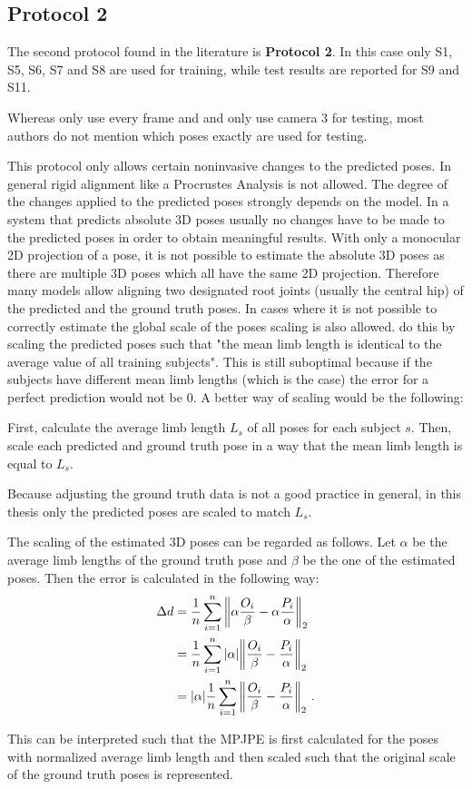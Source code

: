 \subsection{Protocol 2}\label{sec:protocol2}

The second protocol found in the literature is \textbf{Protocol 2}.
In this case only S1, S5, S6, S7 and S8 are used for training, while test results are reported for S9 and S11.

Whereas \citet{sun17} only use every  frame and \citet{moreno-noguer16} and \citet{bogo16} only use camera 3 for testing, most authors do not mention which poses exactly are used for testing.

This protocol only allows certain noninvasive changes to the predicted poses.
In general rigid alignment like a Procrustes Analysis is not allowed.
The degree of the changes applied to the predicted poses strongly depends on the model.
In a system that predicts absolute 3D poses usually no changes have to be made to the predicted poses in order to obtain meaningful results.
With only a monocular 2D projection of a pose, it is not possible to estimate the absolute 3D poses as there are multiple 3D poses which all have the same 2D projection.
Therefore many models \cite{martinez17, zhou18, zhou16, tekin16, pavlakos17} allow aligning two designated root joints (usually the central hip) of the predicted and the ground truth poses.
In cases where it is not possible to correctly estimate the global scale of the poses scaling is also allowed.
\citet{zhou18} do this by scaling the predicted poses such that "the mean limb length is identical to the average value of all training subjects".
This is still suboptimal because if the subjects have different mean limb lengths (which is the case) the error for a perfect prediction would not be 0.
A better way of scaling would be the following:

First, calculate the average limb length $L_s$ of all poses for each subject $s$.
Then, scale each predicted and ground truth pose in a way that the mean limb length is equal to $L_s$.

Because adjusting the ground truth data is not a good practice in general, in this thesis only the predicted poses are scaled to match $L_s$.

The scaling of the estimated 3D poses can be regarded as follows. Let $\alpha$ be the average limb lengths of the ground truth pose and $\beta$ be the one of the estimated poses.
Then the error is calculated in the following way:
\begin{align}
	\Delta d &= \frac{1}{n} \sum_{i = 1}^{n}  \norm{\alpha \frac{O_i}{\beta} - \alpha \frac{P_i}{\alpha}}_2 \\
	&=  \frac{1}{n} \sum_{i = 1}^{n} \abs{\alpha} \norm{\frac{O_i}{\beta} -\frac{P_i}{\alpha}}_2 \\
	&=  \abs{\alpha} \frac{1}{n} \sum_{i = 1}^{n} \norm{\frac{O_i}{\beta} -\frac{P_i}{\alpha}}_2 \ .
	\label{eq:protocol2-mpjpe-scaling}
\end{align}

This can be interpreted such that the MPJPE is first calculated for the poses with normalized average limb length and then scaled such that the original scale of the ground truth poses is represented. 

